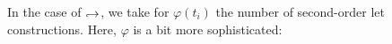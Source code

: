 \documentclass[a4paper,11pt,oneside]{article}
\theoremstyle{plain}
\newcommand{\hookdownarrow}{\mathrel{\rotatebox[origin=c]{180}{$\hookleftarrow$}}}
\newcommand{\inlletarr}{\hookdownarrow}
\newcommand{\icarr}{\hookrightarrow}
\newcommand{\ic}[2]{#1 \icarr #2}
\begin{document}

	In the case of $\inlletarr$, we take for $\varphi (t_{i})$ the number of second-order let constructions. 
	Here, $\varphi$ is a bit more sophisticated:
%
%	
	
	
\end{document}
